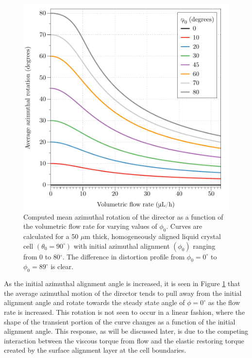 \begin{figure}
\begin{center}
\includegraphics{Figures/45/vary_phi}
\end{center}
\caption[Average director rotation for varying values of $\phi_0$]{\label{fig:different_phis} Computed mean azimuthal rotation of the director as a function of the volumetric flow rate for varying values of $\phi_0$. Curves are calculated for a 50 $\mu$m thick, homogeneously aligned liquid crystal cell $\left(\theta_0=90^{\circ}\right)$ with initial azimuthal alignment $\left(\phi_0\right)$ ranging from 0 to 80$^{\circ}$. The difference in distortion profile from $\phi_0=0^{\circ}$ to $\phi_0=89^{\circ}$ is clear.}
\end{figure}

As the initial azimuthal alignment angle is increased, it is seen in Figure \ref{fig:different_phis} that the average azimuthal motion of the director tends to pull away from the initial alignment angle and rotate towards the steady state angle of $\phi=0^{\circ}$ as the flow rate is increased. This rotation is not seen to occur in a linear fashion, where the shape of the transient portion of the curve changes as a function of the initial alignment angle. This response, as will be discussed later, is due to the competing interaction between the viscous torque from flow and the elastic restoring torque created by the surface alignment layer at the cell boundaries.

